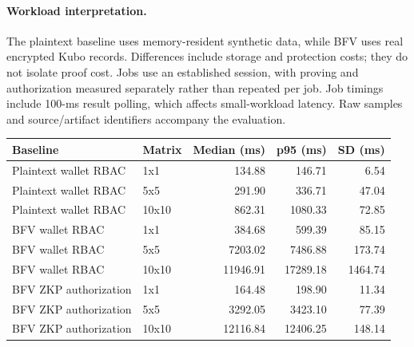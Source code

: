 \paragraph{Workload interpretation.} The plaintext baseline uses memory-resident synthetic data, while BFV uses real encrypted Kubo records. Differences include storage and protection costs; they do not isolate proof cost. Jobs use an established session, with proving and authorization measured separately rather than repeated per job. Job timings include 100-ms result polling, which affects small-workload latency. Raw samples and source/artifact identifiers accompany the evaluation.
\begin{center}\begin{tabular}{llrrr}\toprule Baseline & Matrix & Median (ms) & p95 (ms) & SD (ms)\\\midrule
Plaintext wallet RBAC & 1x1 & 134.88 & 146.71 & 6.54\\
Plaintext wallet RBAC & 5x5 & 291.90 & 336.71 & 47.04\\
Plaintext wallet RBAC & 10x10 & 862.31 & 1080.33 & 72.85\\
BFV wallet RBAC & 1x1 & 384.68 & 599.39 & 85.15\\
BFV wallet RBAC & 5x5 & 7203.02 & 7486.88 & 173.74\\
BFV wallet RBAC & 10x10 & 11946.91 & 17289.18 & 1464.74\\
BFV ZKP authorization & 1x1 & 164.48 & 198.90 & 11.34\\
BFV ZKP authorization & 5x5 & 3292.05 & 3423.10 & 77.39\\
BFV ZKP authorization & 10x10 & 12116.84 & 12406.25 & 148.14\\
\bottomrule\end{tabular}\end{center}
